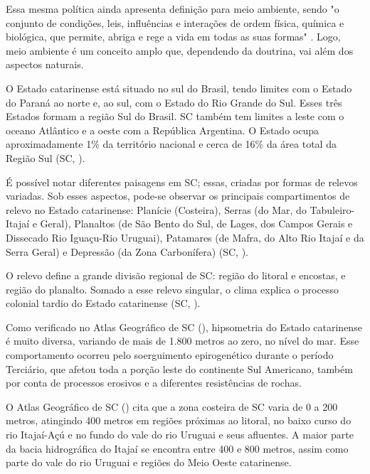 \indent Essa mesma política ainda apresenta definição para meio ambiente, sendo "o conjunto de condições, leis, influências e interações de ordem física, química e biológica, que permite, abriga e rege a vida em todas as suas formas" \cite{BRASIL1981LeiPNMA}. Logo, meio ambiente é um conceito amplo que, dependendo da doutrina, vai além dos aspectos naturais.  

\indent O Estado catarinense está situado no sul do Brasil, tendo limites com o Estado do Paraná ao norte e, ao sul, com o Estado do Rio Grande do Sul. Esses três Estados  formam a região Sul do Brasil. \acrlong{SC} também tem limites a leste com o oceano Atlântico e a oeste com a República Argentina.  O Estado ocupa aproximadamente 1\% da território nacional e  cerca de 16\% da área total da Região Sul (\acrlong{SC}, \citeyear{AtlasSCterritorio}).

\indent É possível notar diferentes paisagens em \acrlong{SC}; essas, criadas por formas de relevos variadas. Sob esses aspectos, pode-se observar os principais compartimentos de relevo no Estado catarinense: Planície (Costeira), Serras (do Mar, do Tabuleiro-Itajaí e Geral), Planaltos (de São Bento do Sul, de Lages, dos Campos Gerais e Dissecado Rio Iguaçu-Rio Uruguai), Patamares (de Mafra, do Alto Rio Itajaí e da Serra Geral) e Depressão (da Zona Carbonífera) (\acrlong{SC}, \citeyear{AtlasSCnatureza}).

\indent O relevo define a grande divisão regional de \acrlong{SC}: região do
litoral e encostas, e região do planalto. Somado a esse relevo singular, o clima explica o processo colonial tardio do Estado catarinense (\acrlong{SC}, \citeyear{AtlasSCpopulacao}).

\indent Como verificado no Atlas Geográfico de \acrlong{SC} (\citeyear{AtlasSCnatureza}), hipsometria do Estado catarinense é muito diversa, variando de mais de 1.800 metros ao zero, no nível do mar. Esse comportamento ocorreu pelo soerguimento epirogenético durante o período Terciário, que afetou toda a porção leste do continente Sul Americano, também por conta de processos erosivos e a diferentes resistências de rochas.

\indent O  Atlas Geográfico de \acrlong{SC} (\citeyear{AtlasSCnatureza}) cita que a zona costeira de \acrlong{SC} varia de 0 a 200 metros, atingindo 400 metros em regiões próximas ao litoral, no baixo curso do rio Itajaí-Açú e no fundo do vale do rio Uruguai e seus afluentes. A maior parte da bacia hidrográfica do Itajaí se encontra entre 400 e 800 metros, assim como parte do vale do rio Uruguai e regiões do Meio Oeste catarinense.

